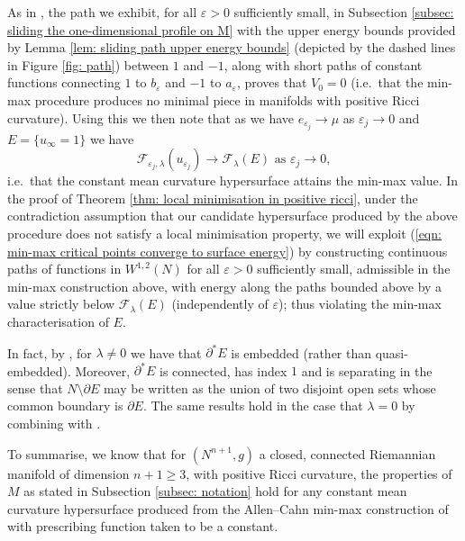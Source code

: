 \documentclass[11pt]{article}
\begin{document}
As in \cite[Theorem 2]{Bellettini-Workman}, the path we exhibit, for all $\varepsilon > 0$ sufficiently small, in Subsection \ref{subsec: sliding the one-dimensional profile on M} with the upper energy bounds provided by Lemma \ref{lem: sliding path upper energy bounds} (depicted by the dashed lines in Figure \ref{fig: path}) between $1$ and $-1$, along with short paths of constant functions connecting $1$ to $b_\varepsilon$ and $-1$ to $a_\varepsilon$, proves that $V_0 = 0$ (i.e.~that the min-max procedure produces no minimal piece in manifolds with positive Ricci curvature). Using this we then note that as we have $e_{\varepsilon_j} \rightarrow \mu$ as $\varepsilon_j \rightarrow 0$ and $E = \{ u_\infty = 1 \}$ we have
\begin{equation}\label{eqn: min-max critical points converge to surface energy}
    \mathcal{F}_{\varepsilon_j,\lambda}(u_{\varepsilon_j}) \rightarrow \mathcal{F}_{\lambda}(E) \text{ as } \varepsilon_j \rightarrow 0,
\end{equation}
i.e.~that the constant mean curvature hypersurface attains the min-max value. In the proof of Theorem \ref{thm: local minimisation in positive ricci}, under the contradiction assumption that our candidate hypersurface produced by the above procedure does not satisfy a local minimisation property, we will exploit (\ref{eqn: min-max critical points converge to surface energy}) by constructing continuous paths of functions in $W^{1,2}(N)$ for all $\varepsilon > 0$ sufficiently small, admissible in the min-max construction above, with energy along the paths bounded above by a value strictly below $\mathcal{F}_\lambda(E)$ (independently of $\varepsilon$); thus violating the min-max characterisation of $E$.

\bigskip

In fact, by \cite[Theorem 4]{Bellettini-Workman}, for $\lambda \neq 0$ we have that $\partial^*E$ is embedded (rather than quasi-embedded). Moreover, $\partial^* E$ is connected, has index $1$ and is  separating in the sense that $N \setminus \partial E$ may be written as the union of two disjoint open sets whose common boundary is $\partial E$. The same results hold in the case that $\lambda = 0$ by combining \cite[Theorem A]{guaraco} with \cite[Theorem 1.8]{bellettini}.

\bigskip

To summarise, we know that for $(N^{n+1},g)$ a closed, connected Riemannian manifold of dimension $n+1  \geq 3$, with positive Ricci curvature, the properties of $M$ as stated in Subsection \ref{subsec: notation} hold for any constant mean curvature hypersurface produced from the Allen--Cahn min-max construction of \cite{bellettini-wickramasekera} with prescribing function taken to be a constant.
\end{document}
